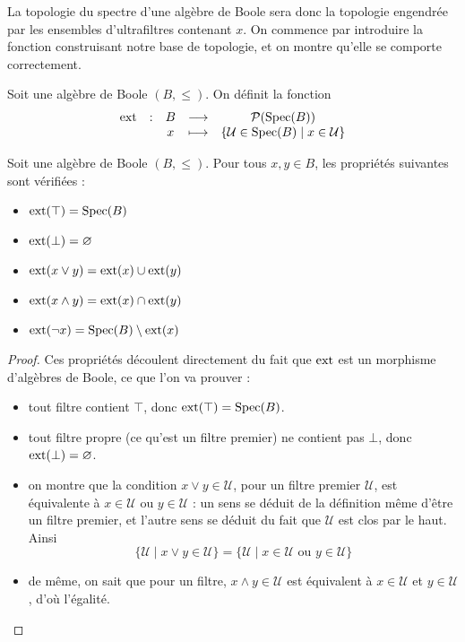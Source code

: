 La topologie du spectre d'une algèbre de Boole sera donc la topologie engendrée
par les ensembles d'ultrafiltres contenant $x$. On commence par introduire la
fonction construisant notre base de topologie, et on montre qu'elle se comporte
correctement.

\begin{definition}
  Soit une algèbre de Boole $(B,\leq)$. On définit la fonction
  \[\begin{array}{ccccc}
  \operatorname{ext} & : & B & \longrightarrow & \mathcal{P}(\operatorname{Spec}(B))\\
  & & x & \longmapsto & \{\mathcal U \in \operatorname{Spec}(B)\mid x \in \mathcal U\}
  \end{array}\]
\end{definition}

\begin{property}
  Soit une algèbre de Boole $(B,\leq)$. Pour tous $x,y\in B$, les propriétés
  suivantes sont vérifiées :
  \begin{itemize}
  \item $\operatorname{ext}(\top) = \operatorname{Spec}(B)$
  \item $\operatorname{ext}(\bot) = \varnothing$
  \item $\operatorname{ext}(x\lor y) = \operatorname{ext}(x)\cup\operatorname{ext}(y)$
  \item $\operatorname{ext}(x\land y) = \operatorname{ext}(x)\cap\operatorname{ext}(y)$
  \item $\operatorname{ext}(\lnot x) = \operatorname{Spec}(B)\setminus\operatorname{ext}(x)$
  \end{itemize}
\end{property}

\begin{proof}
  Ces propriétés découlent directement du fait que $\operatorname{ext}$ est un morphisme
  d'algèbres de Boole, ce que l'on va prouver :
  \begin{itemize}
  \item tout filtre contient $\top$, donc $\operatorname{ext}(\top) = \operatorname{Spec}(B)$.
  \item tout filtre propre (ce qu'est un filtre premier) ne contient pas $\bot$,
    donc $\operatorname{ext}(\bot) = \varnothing$.
  \item on montre que la condition $x\lor y \in \mathcal U$, pour un filtre
    premier $\mathcal U$, est équivalente à $x\in\mathcal U$ ou
    $y\in\mathcal U$ : un sens se déduit de la définition même d'être un filtre
    premier, et l'autre sens se déduit du fait que $\mathcal U$ est clos par le
    haut. Ainsi
    \[\{\mathcal U\mid x\lor y \in \mathcal U\} =
    \{\mathcal U \mid x\in\mathcal U \text{ ou } y\in\mathcal U\}\]
  \item de même, on sait que pour un filtre, $x\land y \in \mathcal U$ est
    équivalent à $x\in\mathcal U$ et $y\in\mathcal U$, d'où l'égalité.
  \end{itemize}
\end{proof}

